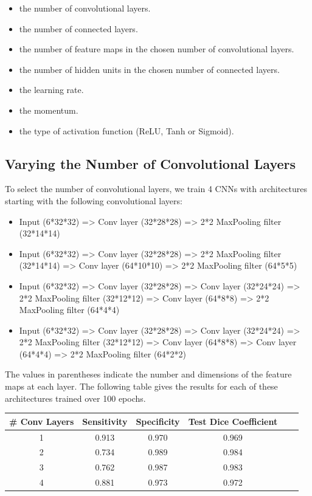 \begin{itemize}
	\item the number of convolutional layers.
	\item the number of connected layers.
	\item the number of feature maps in the chosen number of convolutional layers.
	\item the number of hidden units in the chosen number of connected layers.
	\item the learning rate.
	\item the momentum.
	\item the type of activation function (ReLU, Tanh or Sigmoid).
\end{itemize}

\subsection{Varying the Number of Convolutional Layers}

\noindent To select the number of convolutional layers, we train 4 CNNs with architectures starting with the following convolutional layers:

\begin{itemize}
	\item Input (6*32*32) => Conv layer (32*28*28) => 2*2 MaxPooling filter (32*14*14) 
	\item Input (6*32*32) => Conv layer (32*28*28) => 2*2 MaxPooling filter (32*14*14) => Conv layer (64*10*10) => 2*2 MaxPooling filter (64*5*5)
	\item Input (6*32*32) => Conv layer (32*28*28) => Conv layer (32*24*24) => 2*2 MaxPooling filter (32*12*12) => Conv layer (64*8*8) => 2*2 MaxPooling filter (64*4*4)
	\item Input (6*32*32) => Conv layer (32*28*28) => Conv layer (32*24*24) => 2*2 MaxPooling filter (32*12*12) => Conv layer (64*8*8) => Conv layer (64*4*4) => 2*2 MaxPooling filter (64*2*2)
\end{itemize}

\noindent The values in parentheses indicate the number and dimensions of the feature maps at each layer. The following table gives the results for each of these architectures trained over 100 epochs.\\

{
\centering
\begin{tabular}{cccccc}
\rowcolor[HTML]{C0C0C0} 
        \# Conv Layers & Sensitivity & Specificity & Test Dice Coefficient \\ \hline
1  &      0.913       & 0.970       & 0.969                                                        \\ 
2  &      0.734       & 0.989       & 0.984                                                        \\ 
3  &      0.762       & 0.987       & 0.983                                                        \\ 
4  &      0.881       & 0.973       & 0.972                                                       
\end{tabular}\\
\vspace{0.5cm}
}

